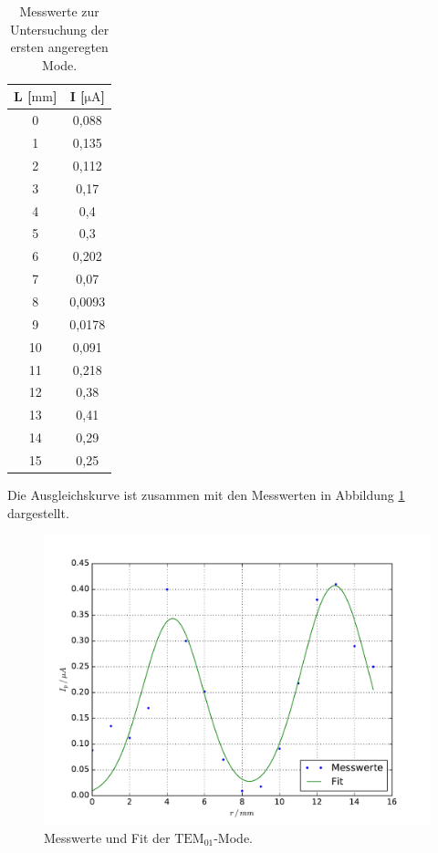 \begin{table}[]
  \centering
\begin{tabular}{c|c}
L [$ \si{\milli\meter}$]   &   I [$ \si{\micro\ampere}$]     \\
  \hline
0  & 0,088  \\
1  & 0,135  \\
2  & 0,112  \\
3  & 0,17   \\
4  & 0,4    \\
5  & 0,3    \\
6  & 0,202  \\
7  & 0,07   \\
8  & 0,0093 \\
9  & 0,0178 \\
10 & 0,091  \\
11 & 0,218  \\
12 & 0,38   \\
13 & 0,41   \\
14 & 0,29   \\
15 & 0,25
\end{tabular}
\caption{Messwerte zur Untersuchung der ersten angeregten Mode.}
\label{mode2}
\end{table}
Die Ausgleichskurve ist zusammen mit den Messwerten in Abbildung \ref{mode2fit} dargestellt.
\begin{figure}[H]
  \centering
  \includegraphics[width=14cm]{bilder/T_10.pdf}
  \caption{Messwerte und Fit der  $\text{TEM}_{01}$-Mode.}
  \label{mode2fit}
\end{figure}
